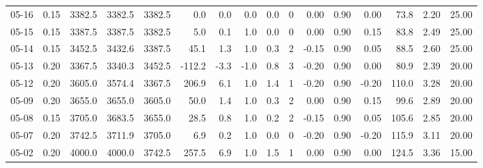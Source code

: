 \begin{threeparttable}
{\begin{tabular}{lrrrrrrrrrrrrrrr}
  05-16 &     0.15 & 3382.5 & 3382.5 & 3382.5 &        0.0 &            0.0 &                      0.0 &                 0.0 &              0 &       0.00 &      0.90 &           0.00 &             73.8 &            2.20 &                  25.00 \\
  05-15 &     0.15 & 3387.5 & 3387.5 & 3382.5 &        5.0 &            0.1 &                      1.0 &                 0.0 &              0 &       0.00 &      0.90 &           0.15 &             83.8 &            2.49 &                  25.00 \\
  05-14 &     0.15 & 3452.5 & 3432.6 & 3387.5 &       45.1 &            1.3 &                      1.0 &                 0.3 &              2 &      -0.15 &      0.90 &           0.05 &             88.5 &            2.60 &                  25.00 \\
  05-13 &     0.20 & 3367.5 & 3340.3 & 3452.5 &     -112.2 &           -3.3 &                     -1.0 &                 0.8 &              3 &      -0.20 &      0.90 &           0.00 &             80.9 &            2.39 &                  20.00 \\
  05-12 &     0.20 & 3605.0 & 3574.4 & 3367.5 &      206.9 &            6.1 &                      1.0 &                 1.4 &              1 &      -0.20 &      0.90 &          -0.20 &            110.0 &            3.28 &                  20.00 \\
  05-09 &     0.20 & 3655.0 & 3655.0 & 3605.0 &       50.0 &            1.4 &                      1.0 &                 0.3 &              2 &       0.00 &      0.90 &           0.15 &             99.6 &            2.89 &                  20.00 \\
  05-08 &     0.15 & 3705.0 & 3683.5 & 3655.0 &       28.5 &            0.8 &                      1.0 &                 0.2 &              2 &      -0.15 &      0.90 &           0.05 &            105.6 &            2.85 &                  20.00 \\
  05-07 &     0.20 & 3742.5 & 3711.9 & 3705.0 &        6.9 &            0.2 &                      1.0 &                 0.0 &              0 &      -0.20 &      0.90 &          -0.20 &            115.9 &            3.11 &                  20.00 \\
  05-02 &     0.20 & 4000.0 & 4000.0 & 3742.5 &      257.5 &            6.9 &                      1.0 &                 1.5 &              1 &       0.00 &      0.90 &           0.00 &            124.5 &            3.36 &                  15.00 \\

\end{tabular}}
\end{threeparttable}

